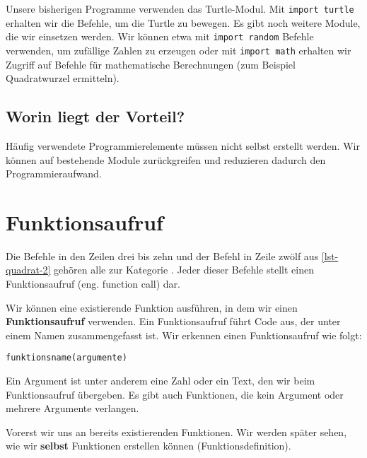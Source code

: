 \begin{example}
Unsere bisherigen Programme verwenden das Turtle-Modul. Mit \lstinline{import turtle} erhalten wir die Befehle, um die Turtle zu bewegen. Es gibt noch weitere Module, die wir einsetzen werden. Wir können etwa mit \lstinline{import random} Befehle verwenden, um zufällige Zahlen zu erzeugen oder mit \lstinline{import math} erhalten wir Zugriff auf Befehle für mathematische Berechnungen (zum Beispiel Quadratwurzel ermitteln).
\end{example}

\subsection{Worin liegt der Vorteil?} Häufig verwendete Programmierelemente müssen nicht selbst erstellt werden. Wir können auf bestehende Module zurückgreifen und reduzieren dadurch den Programmieraufwand.

\section{Funktionsaufruf}

Die Befehle in den Zeilen drei bis zehn und der Befehl in Zeile zwölf aus \autoref{lst-quadrat-2} gehören alle zur Kategorie . Jeder dieser Befehle stellt einen Funktionsaufruf (eng. function call) dar.
 
Wir können eine existierende Funktion ausführen, in dem wir einen \textbf{Funktionsaufruf} verwenden. Ein Funktionsaufruf führt Code aus, der unter einem Namen zusammengefasst ist. Wir erkennen einen Funktionsaufruf wie folgt:

\begin{center}
\lstinline{funktionsname(argumente)}	
\end{center}

Ein Argument ist unter anderem eine Zahl oder ein Text, den wir beim Funktionsaufruf übergeben. Es gibt auch Funktionen, die kein Argument oder mehrere Argumente verlangen.

Vorerst  wir uns an bereits existierenden Funktionen. Wir werden später sehen, wie wir \textbf{selbst} Funktionen erstellen können (Funktionsdefinition).

\begin{figure}[htb]
\centering
{}
\end{figure}

